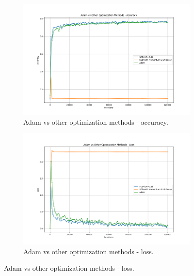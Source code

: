 \documentclass{article}
\begin{document}
\begin{figure}[H]
    \centering
    \begin{subfigure}[t]{0.48\textwidth}
        \vspace{0pt}%
        \centering
        \includegraphics[width=1.1\textwidth]{plots/part3_adam_accuracy.png}
        \caption{Adam vs other optimization methods - accuracy.}
        \label{fig:adam_accuracy}
    \end{subfigure}
    \hfill
    \begin{subfigure}[t]{0.48\textwidth}
        \vspace{0pt}%
        \centering
        \includegraphics[width=1.1\textwidth]{plots/part3_adam_loss.png}
        \caption{Adam vs other optimization methods - loss.}
        \label{fig:adam_loss}
    \end{subfigure}
\end{figure}
\end{document}
